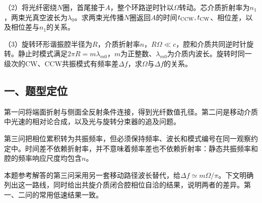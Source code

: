 \documentclass[12pt,a4paper,fontset=fandol]{ctexart}
\begin{document}
\begin{center}
\begin{minipage}{\linewidth}
\centering\begingroup{}
\ifdim\wd\diagrambox>.88\linewidth
\sbox{\diagrambox}{\resizebox{.88\linewidth}{!}{\usebox{\diagrambox}}}\fi
\ifdim\ht\diagrambox>.38\textheight
\resizebox{!}{.38\textheight}{\usebox{\diagrambox}}
\else\usebox{\diagrambox}\fi
\par{}\endgroup\end{minipage}\end{center}

（2）将光纤密绕\(N\)圈，首尾接于\(A\)，整个环路逆时针以\(\Omega\)转动。芯介质折射率为\(n_1\)，两束光真空波长为\(\lambda_0\)。求两束光传播\(N\)圈返回\(A\)的时间\(t_{\rm CCW},t_{\rm CW}\)、相位差，以及相位差与\(n_1\)的关系。

（3）旋转环形谐振腔半径为\(R\)，介质折射率\(n\)，\(R\Omega\ll c\)，腔和介质共同逆时针旋转。静止时模式满足\(2\pi R=m\lambda_{m0}\)，\(m\)为正整数、\(\lambda_{m0}\)为介质内波长。旋转时同一级次的CW、CCW共振模式有频率差\(\Delta f\)，求\(\Omega\)与\(\Delta f\)的关系。

\subsection{一、题型定位}\label{ux4e00ux9898ux578bux5b9aux4f4d-5}

第一问将端面折射与侧面全反射条件连接，得到光纤数值孔径。第二问是移动介质中光速的相对论合成，以及光与旋转分束器的追及问题。

第三问把相位累积转为共振频率，但必须保持频率、波长和模式编号在同一观察约定中。时间差不依赖折射率，并不意味着频率差也不依赖折射率：静态共振频率和腔的频率响应尺度均包含\(n\)。

本题参考解答的第三问采用另一套移动路径波长替代，给\(\Delta f\simeq m\Omega/\pi\)。下文明确列出这一路线，同时给出共旋介质闭合腔相位自洽的结果，说明两者的差异。第一、二问的常用低速结果一致。
\end{document}
